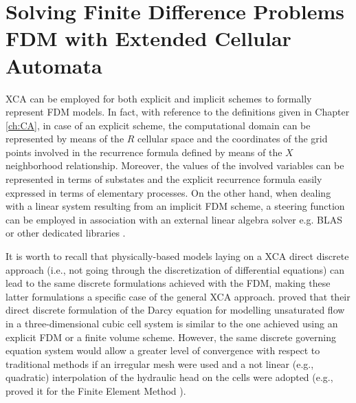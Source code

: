         
\section[Solving FDM with XCA]{Solving Finite Difference Problems FDM with Extended Cellular Automata}
    XCA can be employed for both explicit and implicit schemes to formally
    represent FDM models. In fact, with reference to the definitions given in Chapter \ref{ch:CA}, in case of an
    explicit scheme, the computational domain can be represented by
    means of the $R$ cellular space and the coordinates of the grid
    points involved in the recurrence formula defined by means of the
    $X$ neighborhood relationship. Moreover, the values of the involved
    variables can be represented in terms of substates and the
    explicit recurrence formula easily expressed in terms of
    elementary processes. On the other hand, when dealing with a linear system
    resulting from an implicit FDM scheme, a steering function can be
    employed in association with an
    external linear algebra solver e.g. BLAS\cite{2002:USB:567806.567807} or other dedicated libraries\cite{Kestur:2010:BCF:1848074.1848496} .

    It is worth to recall that physically-based models laying on a XCA
    direct discrete approach (i.e., not going through the
    discretization of differential equations) can lead to the same
    discrete formulations achieved with the FDM, making these latter
    formulations a specific case of the general XCA
    approach. \cite{Mendicino2006} proved that
    their direct discrete formulation of the Darcy equation for
    modelling unsaturated flow in a three-dimensional cubic cell
    system is similar to the one achieved using an explicit FDM or a
    finite volume scheme. However, the same discrete governing
    equation system would allow a greater level of convergence with
    respect to traditional methods if an irregular mesh were used
    and a not linear (e.g., quadratic) interpolation of the hydraulic
    head on the cells were adopted (e.g., \citeauthor{Tonti2001237} proved it for the Finite  Element Method \cite{Tonti2001237}). 